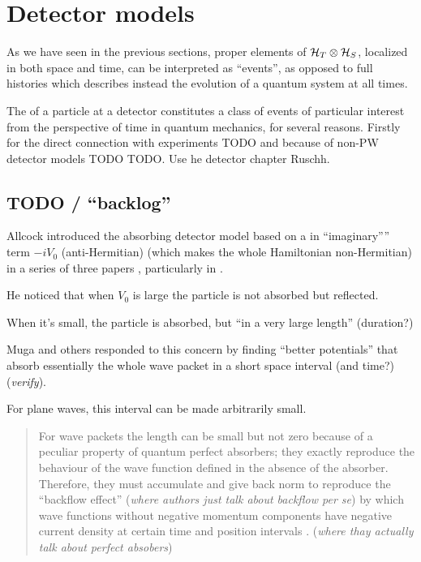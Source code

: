 \section{Detector models}

As we have seen in the previous sections, proper elements of $\mathcal{H}_T \otimes \mathcal{H}_S$,
localized in both space and time, can be interpreted as ``events'',
as opposed to full histories which describes instead the evolution
of a quantum system at all times.

The  of a particle at a detector
constitutes a class of events
of particular interest from the perspective of time
in quantum mechanics, for several reasons.
Firstly for the direct connection with experiments TODO
and because of non-PW detector models TODO TODO.
Use he detector chapter Ruschh.

\subsection*{TODO / ``backlog''}

Allcock introduced the absorbing detector model based on a in ``imaginary'''' term $-iV_0$
(anti-Hermitian) (which makes the whole Hamiltonian non-Hermitian) in a series of three papers
\parencite{Allcock-1, Allcock-2, Allcock-3},
particularly in \cite[sec. II-IV]{Allcock-2}.

He noticed that when $V_0$ is large the particle is not absorbed but reflected.

When it's small, the particle is absorbed, but ``in a very large length'' (duration?)

Muga and others responded to this concern by finding ``better potentials'' that absorb essentially the
whole wave packet in a short space interval (and time?)
\parencite{Muga_TOAQM, Muga_CompositeAbsPot, ComplexAbsPot} (\emph{verify}).

For plane waves, this interval can be made arbitrarily small.

\begin{quotation}
  For wave packets the length can be small but not zero because of a
  peculiar property of quantum perfect absorbers; they exactly reproduce
  the behaviour of the wave function defined in the absence of the absorber.
  Therefore, they must accumulate and give back norm to reproduce the
  ``backflow effect'' \parencite{Bracken_bf, Bracken_ProbTransport}
  (\emph{where authors just talk about backflow per se})
  by which wave functions without negative momentum components
  have negative current density at certain time and position intervals
  \parencite{Leavens_backflow}. (\emph{where thay actually talk about perfect absobers})
\end{quotation}

